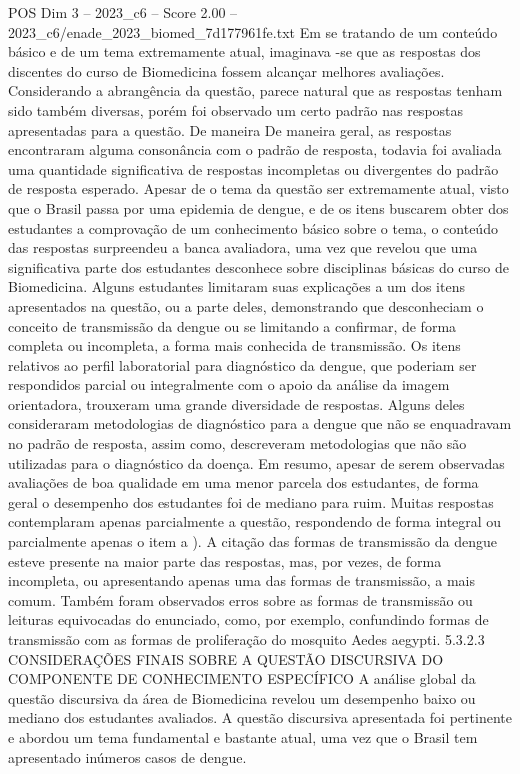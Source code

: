 \begin{textsample}{POS Dim 3 – 2023\_c6 – Score 2.00 – 2023\_c6/enade\_2023\_biomed\_7d177961fe.txt}
Em se tratando de um conteúdo básico e de um tema extremamente atual, imaginava -se que as respostas dos discentes do curso de Biomedicina fossem alcançar melhores avaliações.
Considerando a abrangência da questão, parece natural que as respostas tenham sido também diversas, porém foi observado um certo padrão nas respostas apresentadas para a questão.
De maneira De maneira geral, as respostas encontraram alguma consonância com o padrão de resposta, todavia foi avaliada uma quantidade significativa de respostas incompletas ou divergentes do padrão de resposta esperado.
Apesar de o tema da questão ser extremamente atual, visto que o Brasil passa por uma epidemia de dengue, e de os itens buscarem obter dos estudantes a comprovação de um conhecimento básico sobre o tema, o conteúdo das respostas surpreendeu a banca avaliadora, uma vez que revelou que uma significativa parte dos estudantes desconhece sobre disciplinas básicas do curso de Biomedicina.
Alguns estudantes limitaram suas explicações a um dos itens apresentados na questão, ou a parte deles, demonstrando que desconheciam o conceito de transmissão da dengue ou se limitando a confirmar, de forma completa ou incompleta, a forma mais conhecida de transmissão.
Os itens relativos ao perfil laboratorial para diagnóstico da dengue, que poderiam ser respondidos parcial ou integralmente com o apoio da análise da imagem orientadora, trouxeram uma grande diversidade de respostas.
Alguns deles consideraram metodologias de diagnóstico para a dengue que não se enquadravam no padrão de resposta, assim como, descreveram metodologias que não são utilizadas para o diagnóstico da doença.
Em resumo, apesar de serem observadas avaliações de boa qualidade em uma menor parcela dos estudantes, de forma geral o desempenho dos estudantes foi de mediano para ruim.
Muitas respostas contemplaram apenas parcialmente a questão, respondendo de forma integral ou parcialmente apenas o item a ).
A citação das formas de transmissão da dengue esteve presente na maior parte das respostas, mas, por vezes, de forma incompleta, ou apresentando apenas uma das formas de transmissão, a mais comum.
Também foram observados erros sobre as formas de transmissão ou leituras equivocadas do enunciado, como, por exemplo, confundindo formas de transmissão com as formas de proliferação do mosquito Aedes aegypti. 5.3.2.3 CONSIDERAÇÕES FINAIS SOBRE A QUESTÃO DISCURSIVA DO COMPONENTE DE CONHECIMENTO ESPECÍFICO A análise global da questão discursiva da área de Biomedicina revelou um desempenho baixo ou mediano dos estudantes avaliados.
A questão discursiva apresentada foi pertinente e abordou um tema fundamental e bastante atual, uma vez que o Brasil tem apresentado inúmeros casos de dengue.

\end{textsample}
